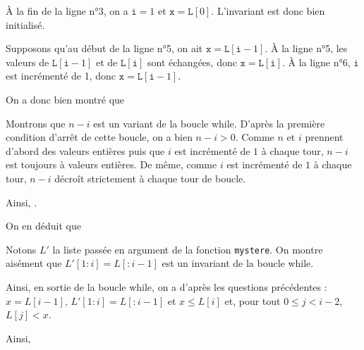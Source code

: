 \exer{}
\setcounter{numques}{0}

\question{} À la fin de la ligne n°3, on a $\texttt i = 1$ et $\texttt x = \texttt L[0]$. L'invariant est donc bien initialisé. 

Supposons qu'au début de la ligne n°5, on ait $\texttt x = \texttt L[\texttt i-1]$. À la ligne n°5, les valeurs de $\texttt L[\texttt i-1]$ et de $\texttt L[\texttt i]$ sont échangées, donc $\texttt x = \texttt L[\texttt i]$.
À la ligne n°6, $\texttt i$ est incrémenté de 1, donc $\texttt x = \texttt L[\texttt i-1]$.

On a donc bien montré que 

\question{} Montrons que $n-i$ est un variant de la boucle while. D'après la première condition d'arrêt de cette boucle, on a bien $n-i>0$. Comme $n$ et $i$ prennent d'abord des valeurs entières puis que $i$ est incrémenté de $1$ à chaque tour, $n-i$ est toujours à valeurs entières. De même, comme $i$ est incrémenté de $1$ à chaque tour, $n-i$ décroît strictement à chaque tour de boucle. 

Ainsi, .

On en déduit que 

\question{} Notons $L'$ la liste passée en argument de la fonction \texttt{mystere}. On montre aisément que $L'[1:i] = L[:i-1]$ est un invariant de la boucle while. 

Ainsi, en sortie de la boucle while, on a d'après les questions précédentes : $x = L[i-1]$, $L'[1:i] = L[:i-1]$ et $x \leq L[i]$ et, pour tout $0 \leq j < i-2$, $L[j] < x$.

Ainsi,

\noindent{}

